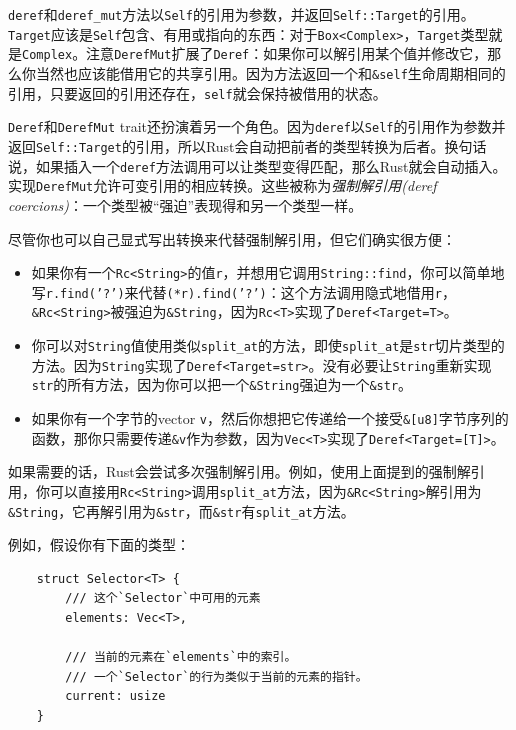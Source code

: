 \texttt{deref}和\texttt{deref\_mut}方法以\texttt{Self}的引用为参数，并返回\texttt{Self::Target}的引用。\texttt{Target}应该是\texttt{Self}包含、有用或指向的东西：对于\texttt{Box<Complex>}，\texttt{Target}类型就是\texttt{Complex}。注意\texttt{DerefMut}扩展了\texttt{Deref}：如果你可以解引用某个值并修改它，那么你当然也应该能借用它的共享引用。因为方法返回一个和\texttt{\&self}生命周期相同的引用，只要返回的引用还存在，\texttt{self}就会保持被借用的状态。

\texttt{Deref}和\texttt{DerefMut} trait还扮演着另一个角色。因为\texttt{deref}以\texttt{Self}的引用作为参数并返回\texttt{Self::Target}的引用，所以Rust会自动把前者的类型转换为后者。换句话说，如果插入一个\texttt{deref}方法调用可以让类型变得匹配，那么Rust就会自动插入。实现\texttt{DerefMut}允许可变引用的相应转换。这些被称为\emph{强制解引用(deref coercions)}：一个类型被“强迫”表现得和另一个类型一样。

尽管你也可以自己显式写出转换来代替强制解引用，但它们确实很方便：
\begin{itemize}
    \item 如果你有一个\texttt{Rc<String>}的值\texttt{r}，并想用它调用\texttt{String::find}，你可以简单地写\texttt{r.find('?')}来代替\texttt{(*r).find('?')}：这个方法调用隐式地借用\texttt{r}，\texttt{\&Rc<String>}被强迫为\texttt{\&String}，因为\texttt{Rc<T>}实现了\texttt{Deref<Target=T>}。
    \item 你可以对\texttt{String}值使用类似\texttt{split\_at}的方法，即使\texttt{split\_at}是\texttt{str}切片类型的方法。因为\texttt{String}实现了\texttt{Deref<Target=str>}。没有必要让\texttt{String}重新实现\texttt{str}的所有方法，因为你可以把一个\texttt{\&String}强迫为一个\texttt{\&str}。
    \item 如果你有一个字节的vector \texttt{v}，然后你想把它传递给一个接受\texttt{\&[u8]}字节序列的函数，那你只需要传递\texttt{\&v}作为参数，因为\texttt{Vec<T>}实现了\texttt{Deref<Target=[T]>}。
\end{itemize}

如果需要的话，Rust会尝试多次强制解引用。例如，使用上面提到的强制解引用，你可以直接用\texttt{Rc<String>}调用\texttt{split\_at}方法，因为\texttt{\&Rc<String>}解引用为\texttt{\&String}，它再解引用为\texttt{\&str}，而\texttt{\&str}有\texttt{split\_at}方法。

例如，假设你有下面的类型：
\begin{verbatim}
    struct Selector<T> {
        /// 这个`Selector`中可用的元素
        elements: Vec<T>,

        /// 当前的元素在`elements`中的索引。
        /// 一个`Selector`的行为类似于当前的元素的指针。
        current: usize
    }
\end{verbatim}

